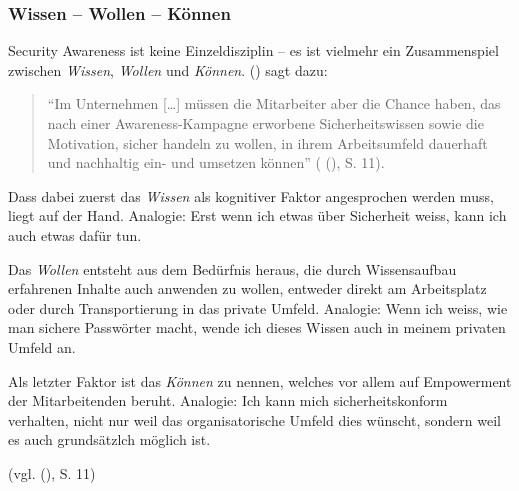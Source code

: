 \documentclass[../../main.tex]{subfiles}
\begin{document}
\subsubsection{Wissen -- Wollen -- Können}
\label{wissen_wollen_können}
\begin{sloppypar}
Security Awareness ist keine Einzeldisziplin -- es ist vielmehr ein Zusammenspiel zwischen \textit{Wissen}, \textit{Wollen} und \textit{Können}. \citeauthor{helisch_security_2009} (\citeyear{helisch_security_2009}) sagt dazu:

\begin{quote}
"`Im Unternehmen [\dots] müssen die Mitarbeiter aber die Chance haben, das nach einer Awareness-Kampagne erworbene Sicherheitswissen sowie die Motivation, sicher handeln zu wollen, in ihrem Arbeitsumfeld dauerhaft und nachhaltig ein- und umsetzen können"' (\citeauthor{helisch_security_2009} (\citeyear{helisch_security_2009}), S. 11).
\end{quote}

Dass dabei zuerst das \textit{Wissen} als kognitiver Faktor angesprochen werden muss, liegt auf der Hand. Analogie: Erst wenn ich etwas über Sicherheit weiss, kann ich auch etwas dafür tun. 

Das \textit{Wollen} entsteht aus dem Bedürfnis heraus, die durch Wissensaufbau erfahrenen Inhalte auch anwenden zu wollen, entweder direkt am Arbeitsplatz oder durch Transportierung in das private Umfeld. Analogie: Wenn ich weiss, wie man sichere Passwörter macht, wende ich dieses Wissen auch in meinem privaten Umfeld an.

Als letzter Faktor ist das \textit{Können} zu nennen, welches vor allem auf Empowerment der Mitarbeitenden beruht. Analogie: Ich kann mich sicherheitskonform verhalten, nicht nur weil das organisatorische Umfeld dies wünscht, sondern weil es auch grundsätzlch möglich ist.

(vgl. \citeauthor{helisch_security_2009} (\citeyear{helisch_security_2009}), S. 11)
\end{sloppypar}
\end{document}
